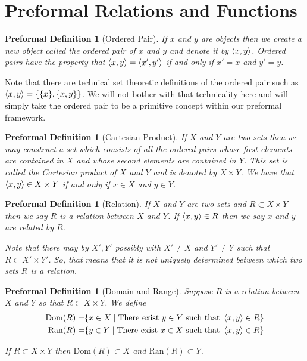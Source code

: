 \documentclass[oneside, 12pt]{book}
\theoremstyle{break}
\newtheorem{preformal definition}[definition]{Preformal Definition}
\newtheorem{preformal theorem}[theorem]{Preformal Theorem}
\begin{document}
		\section{Preformal Relations and Functions}
			\begin{preformal definition}[Ordered Pair]
				If $x$ and $y$ are objects then we create a new object called the ordered pair of $x$ and $y$ and denote it by $\braket{x, y}$.
				Ordered pairs have the property that $\braket{x, y} = \braket{x', y'}$ if and only if $x' = x$ and $y' = y$.
			\end{preformal definition}
			
			 Note that there are technical set theoretic definitions of the ordered pair such as $\braket{x, y} = \{\{x\}, \{x, y\}\}$. 
			 We will not bother with that technicality here and will simply take the ordered pair to be a primitive concept within our preformal framework.			
			
			\begin{preformal definition}[Cartesian Product]
				If $X$ and $Y$ are two sets then we may construct a set which consists of all the ordered pairs whose first elements are contained in $X$ and whose second elements are contained in $Y$.
				This set is called the Cartesian product of $X$ and $Y$ and is denoted by $X\times Y$.
				We have that $\braket{x, y} \in X\times Y$ if and only if $x \in X$ and $y \in Y$.
			\end{preformal definition}
			
			\begin{preformal definition}[Relation]
				If $X$ and $Y$ are two sets and $R\subset X\times Y$ then we say $R$ is a relation between $X$ and $Y$.
				If $\braket{x, y} \in R$ then we say $x$ and $y$ are related by $R$.

				Note that there may by $X', Y'$ possibly with $X' \neq X$ and $Y' \neq Y$ such that $R\subset X' \times Y'$. 
				So, that means that it is not uniquely determined between which two sets $R$ is a relation.
			\end{preformal definition}
			
			\begin{preformal definition}[Domain and Range]
				Suppose $R$ is a relation between $X$ and $Y$ so that $R\subset X \times Y$.
				We define
				\begin{align*}
					\text{Dom}(R) =& \{x \in X \mid \text{There exist } y \in Y \text{ such that } \braket{x, y} \in R\}\\
					\text{Ran}(R) =& \{y \in Y \mid \text{There exist } x \in X \text{ such that } \braket{x, y} \in R\}
				\end{align*}
				
				If $R\subset X \times Y$ then $\text{Dom}(R)\subset X$ and $\text{Ran}(R)\subset Y$.
			\end{preformal definition}
			
\end{document}
